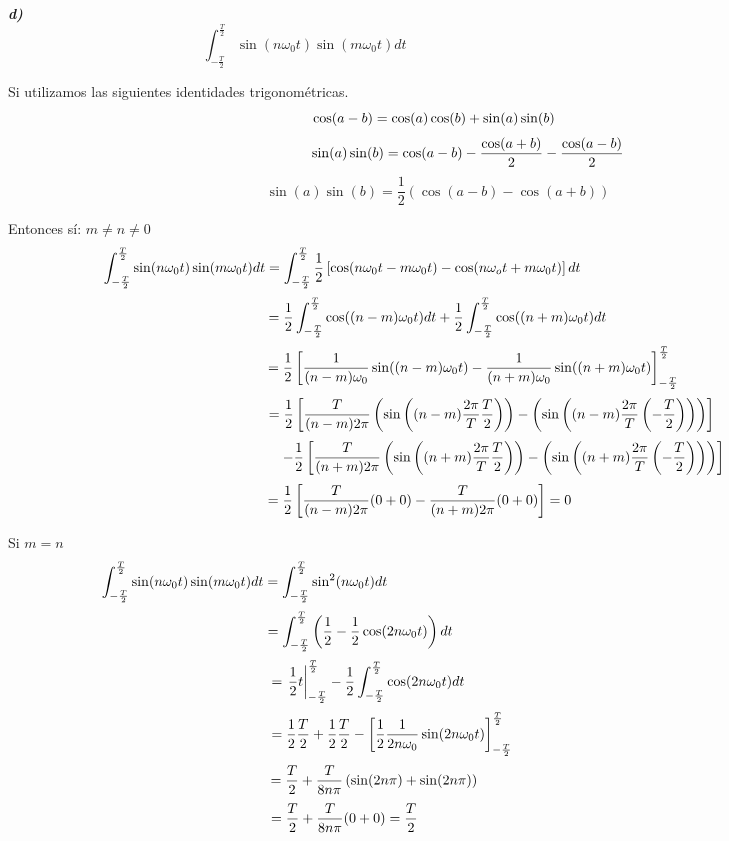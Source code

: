 \documentclass[a4paper]{article}
\begin{document}
{} \textbf{\textit{d)}}  
\[
\int_{-\frac{T}{2}}^{\frac{T}{2}} \sin(n\omega_{0}t)\sin(m\omega_{0}t)dt 
\hspace{8cm}
\]

{} Si utilizamos las siguientes identidades trigonom\'etricas.  
\[
\cos(a-b)=\cos(a)\cos(b)+\sin(a)\sin(b) \hspace{0.2cm}
\]
\[
\hspace{1.5cm} \sin(a)\sin(b)=\cos(a-b)-\frac{\cos(a+b)}{2}-\frac{\cos(a-b)}{%
2}
\]
\[
\sin(a)\sin(b)=\frac{1}{2}(\cos(a-b)-\cos(a+b))
\]

{} Entonces s\'i: $m\neq n\neq 0$  
\[
\int_{-\frac{T}{2}}^{\frac{T}{2}} \sin(n\omega_{0}t)\sin(m\omega_{0}t)dt =
\int_{-\frac{T}{2}}^{\frac{T}{2}}\frac{1}{2}\left[\cos(n\omega_{0}t-m%
\omega_{0}t)-\cos(n\omega_{o}t+m\omega_{0}t)\right]dt \hspace{4.8cm}
\]
\[
= \frac{1}{2}\int_{-\frac{T}{2}}^{\frac{T}{2}}\cos((n-m)\omega_{0}t)dt+\frac{%
1}{2}\int_{-\frac{T}{2}}^{\frac{T}{2}}\cos((n+m)\omega_{0}t)dt
\]
\[
\hspace{1.8cm} = \frac{1}{2}\left[\frac{1}{(n-m)\omega_{0}}%
\sin((n-m)\omega_{0}t) - \frac{1}{(n+m)\omega_{0}}\sin((n+m)\omega_{0}t)%
\right]_{-\frac{T}{2}}^{\frac{T}{2}}
\]
\[
\hspace{2.7cm}=\frac{1}{2}\left[\frac{T}{(n-m)2\pi}\left(\sin\left((n-m)%
\frac{2\pi}{T}\frac{T}{2}\right) \right) - \left(\sin\left((n-m)\frac{2\pi}{T%
}\left(-\frac{T}{2}\right)\right) \right)\right]
\]
\[
\hspace{3.3cm} -\frac{1}{2}\left[\frac{T}{(n+m)2\pi}\left(\sin\left((n+m)%
\frac{2\pi}{T}\frac{T}{2}\right) \right) - \left(\sin\left((n+m)\frac{2\pi}{T%
}\left(-\frac{T}{2}\right)\right) \right)\right]
\]
\[
=\frac{1}{2}\left[\frac{T}{(n-m)2\pi}(0+0)-\frac{T}{(n+m)2\pi}(0+0)\right]=0 
\hspace{0.9cm}
\]

{} Si $m=n$  
\[
\int_{-\frac{T}{2}}^{\frac{T}{2}} \sin(n\omega_{0}t)\sin(m\omega_{0}t)dt =
\int_{-\frac{T}{2}}^{\frac{T}{2}} \sin^{2}(n\omega_{0}t)dt \hspace{9.7cm}
\]
\[
=\int_{-\frac{T}{2}}^{\frac{T}{2}}\left(\frac{1}{2}-\frac{1}{2}%
\cos(2n\omega_{0}t)\right)dt \hspace{3.9cm}
\]
\[
= \left.\frac{1}{2}t\right|_{-\frac{T}{2}}^{\frac{T}{2}} - \frac{1}{2}\int_{-%
\frac{T}{2}}^{\frac{T}{2}}\cos(2n\omega_{0}t)dt \hspace{3.5cm}
\]
\[
=\frac{1}{2}\frac{T}{2}+\frac{1}{2}\frac{T}{2} - \left[\frac{1}{2}\frac{1}{%
2n\omega_{0}}\sin(2n\omega_{0}t)\right]_{-\frac{T}{2}}^{\frac{T}{2}}\hspace{%
2.3cm} 
\]
\[
=\frac{T}{2}+\frac{T}{8n\pi}\left(\sin(2n\pi)+\sin(2n\pi )\right) \hspace{%
3.2cm}
\]
\[
=\frac{T}{2}+\frac{T}{8n\pi}(0+0)=\frac{T}{2} \hspace{4.7cm}
\]
\end{document}
